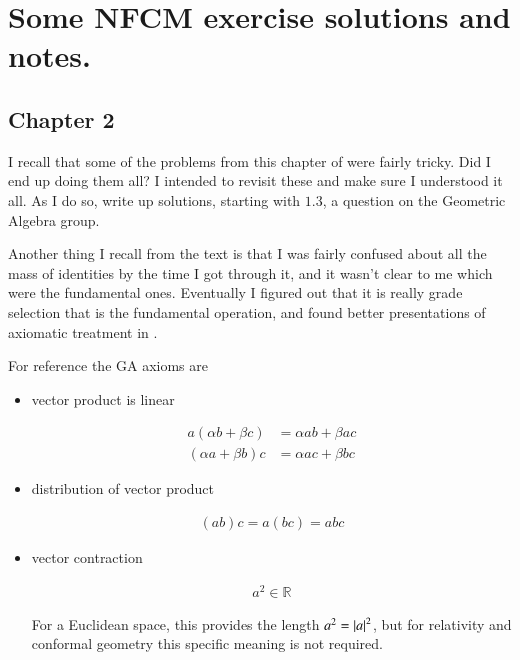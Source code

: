 \chapter{Some NFCM exercise solutions and notes. }
\label{chap:nfcmCh2}
\date{Nov 27, 2008.  nfcmCh2.tex}

\section{Chapter 2 }

I recall that some of the problems from this chapter of
\citep{hestenes1999nfc}
were fairly tricky.  Did I end up doing them all?  I intended to
revisit these and make sure I understood it all.  As I do so, write up
solutions, starting with $1.3$, a question on the Geometric Algebra group.

Another thing I recall from the text is that I was fairly confused about
all the mass of identities by the time I got through it, and it wasn't clear
to me which were the fundamental ones.
Eventually I figured out that it is
really grade selection that is the fundamental operation, and
found better presentations of axiomatic treatment in \citep{doran2003gap}.

For reference the GA axioms are

\begin{itemize}
\item vector product is linear

\begin{align}
a ( \alpha b + \beta c) &= \alpha a b + \beta a c \\
( \alpha a + \beta b) c &= \alpha a c + \beta b c
\end{align}

\item distribution of vector product

\begin{align}
(a b) c = a (b c) = a b c
\end{align}

\item vector contraction

\begin{align}\label{eqn:nfcm_ch2:contractionAxiom}
a^2 \in \mathbb{R}
\end{align}

For a Euclidean space, this provides the length $a^2 = \left\lvert{a}\right\rvert^2$, but for relativity and conformal geometry this specific meaning is not required.

\end{itemize}

